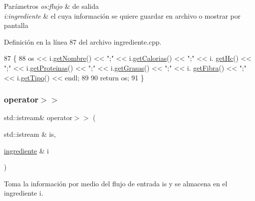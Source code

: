 \begin{DoxyParams}{Parámetros}
{\em os\+:flujo} & de salida \\
\hline
{\em i\+:ingrediente} & el cuya información se quiere guardar en archivo o mostrar por pantalla \\
\hline
\end{DoxyParams}


Definición en la línea 87 del archivo ingrediente.\+cpp.


\begin{DoxyCode}
87                                                               \{
88     os << i.\hyperlink{classingrediente_a8da227d03af8811627434703922b463a}{getNombre}() << \textcolor{stringliteral}{";"} << i.\hyperlink{classingrediente_ab61ade959dac30f2e025b806531d34cd}{getCalorias}() << \textcolor{stringliteral}{";"} << i.
      \hyperlink{classingrediente_ae51c33e37001b7807a7b2d7bd7352355}{getHc}() << \textcolor{stringliteral}{";"} << i.\hyperlink{classingrediente_a2506bbdfd9accd7247d1734838713d73}{getProteinas}() << \textcolor{stringliteral}{";"} << i.\hyperlink{classingrediente_af4639a93a991a37158d137d438db84fc}{getGrasas}() << \textcolor{stringliteral}{";"} <<  i.
      \hyperlink{classingrediente_a7abcffbf8f3a03861183514216125849}{getFibra}() << \textcolor{stringliteral}{";"} << i.\hyperlink{classingrediente_a03334e887add1dbdc7991de77234ede7}{getTipo}() << endl;
89     
90     \textcolor{keywordflow}{return} os;
91 \}
\end{DoxyCode}
\mbox{\label{classingrediente_a5312eddb4e806d73874b710038bc3f52}} 
\subsubsection{\texorpdfstring{operator$>$$>$}{operator>>}}
{\footnotesize\ttfamily std\+::istream\& operator$>$$>$ (\begin{DoxyParamCaption}\item[{std\+::istream \&}]{is,  }\item[{\hyperlink{classingrediente}{ingrediente} \&}]{i }\end{DoxyParamCaption})\hspace{0.3cm}{\ttfamily [friend]}}



Toma la información por medio del flujo de entrada is y se almacena en el ingrediente i. 


